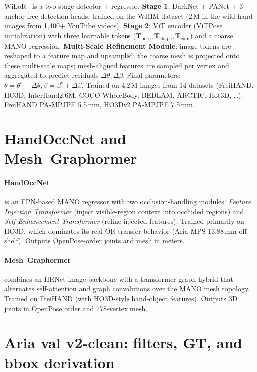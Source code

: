 \documentclass{article}
\begin{document}
WiLoR~\cite{potamias2025wilor} is a two-stage detector + regressor. \textbf{Stage 1}: DarkNet + PANet + 3 anchor-free detection heads, trained on the WHIM dataset (2\,M in-the-wild hand images from 1{,}400+ YouTube videos). \textbf{Stage 2}: ViT encoder (ViTPose initialization) with three learnable tokens ($\mathbf{T}_{\text{pose}}, \mathbf{T}_{\text{shape}}, \mathbf{T}_{\text{cam}}$) and a coarse MANO regression. \textbf{Multi-Scale Refinement Module}: image tokens are reshaped to a feature map and upsampled; the coarse mesh is projected onto these multi-scale maps; mesh-aligned features are sampled per vertex and aggregated to predict residuals $\Delta \theta, \Delta \beta$. Final parameters: $\theta = \theta^c + \Delta\theta, \beta = \beta^c + \Delta\beta$. Trained on 4.2\,M images from 14 datasets (FreiHAND, HO3D, InterHand2.6M, COCO-WholeBody, BEDLAM, ARCTIC, Hot3D, …). FreiHAND PA-MPJPE 5.5\,mm, HO3Dv2 PA-MPJPE 7.5\,mm.

\section{HandOccNet and Mesh~Graphormer}
\label{app:mgfm}

\paragraph{HandOccNet~\cite{park2022handoccnet}} is an FPN-based MANO regressor with two occlusion-handling modules: \emph{Feature Injection Transformer} (inject visible-region context into occluded regions) and \emph{Self-Enhancement Transformer} (refine injected features). Trained primarily on HO3D, which dominates its real-OR transfer behavior (Aria-MPS 13.88\,mm off-shelf). Outputs OpenPose-order joints and mesh in meters.

\paragraph{Mesh~Graphormer~\cite{lin2021meshgraphormer}} combines an HRNet image backbone with a transformer-graph hybrid that alternates self-attention and graph convolutions over the MANO mesh topology. Trained on FreiHAND (with HO3D-style hand-object features). Outputs 3D joints in OpenPose order and 778-vertex mesh.

\section{Aria val v2-clean: filters, GT, and bbox derivation}
\label{app:aria}
\end{document}
